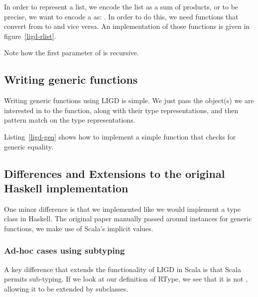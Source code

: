 \begin{example}[Lists]
In order to represent a list, we encode the
list as a sum of products, or to be precise, we want to encode a 
as: . In order to do this, we need functions
that convert from  to  and
vice versa. An implementation of those functions is given in figure~\ref{ligd-rlist}.
%



Note how the first parameter of  is recursive.
\end{example}

\subsection{Writing generic functions}
Writing generic functions using LIGD is simple. We just pass the object(s)
we are interested in to the function, along with their type representations,
and then pattern match on the type representations.

\begin{example}
Listing~\ref{ligd-geq} shows how to implement a simple function that checks for
generic equality.

  
\end{example}


\subsection{Differences and Extensions to the original Haskell implementation}
One minor difference is that we implemented  like we would implement
a type class in Haskell. The original paper manually passed around 
instances for generic functions, we make use of Scala's implicit values.


\subsubsection{Ad-hoc cases using subtyping}
A key difference that extends the functionality of LIGD in Scala is that
Scala permits sub-typing. If we look at our definition of RType, we see
that it is not , allowing it to be extended by subclasses.


